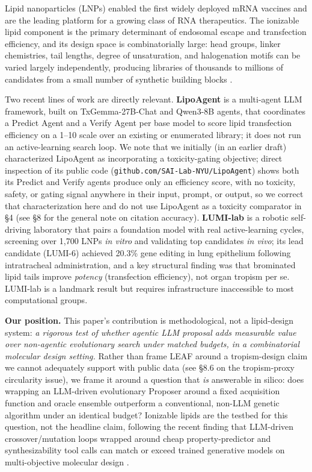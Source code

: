 \documentclass{article}
\begin{document}
Lipid nanoparticles (LNPs) enabled the first widely deployed mRNA vaccines
and are the leading platform for a growing class of RNA therapeutics. The
ionizable lipid component is the primary determinant of endosomal escape
and transfection efficiency, and its design space is combinatorially large:
head groups, linker chemistries, tail lengths, degree of unsaturation, and
halogenation motifs can be varied largely independently, producing
libraries of thousands to millions of candidates from a small number of
synthetic building blocks \citep{xu2023ugi}.

Two recent lines of work are directly relevant. \textbf{LipoAgent}
\citep{li2025lipoagent} is a multi-agent LLM framework, built on
TxGemma-27B-Chat and Qwen3-8B agents, that coordinates a Predict Agent and
a Verify Agent per base model to score lipid transfection efficiency on a
1--10 scale over an existing or enumerated library; it does not run an
active-learning search loop. We note that we initially (in an earlier
draft) characterized LipoAgent as incorporating a toxicity-gating
objective; direct inspection of its public code
(\texttt{github.com/SAI-Lab-NYU/LipoAgent}) shows both its Predict and
Verify agents produce only an efficiency score, with no toxicity, safety,
or gating signal anywhere in their input, prompt, or output, so we correct
that characterization here and do not use LipoAgent as a toxicity
comparator in \S4 (see \S8 for the general note on citation accuracy).
\textbf{LUMI-lab} \citep{lumilab2026} is a robotic self-driving laboratory
that pairs a foundation model with real active-learning cycles, screening
over 1,700 LNPs \emph{in vitro} and validating top candidates \emph{in
vivo}; its lead candidate (LUMI-6) achieved 20.3\% gene editing in lung
epithelium following intratracheal administration, and a key structural
finding was that brominated lipid tails improve \emph{potency}
(transfection efficiency), not organ tropism per se. LUMI-lab is a landmark
result but requires infrastructure inaccessible to most computational
groups.

\textbf{Our position.} This paper's contribution is methodological, not a
lipid-design system: \emph{a rigorous test of whether agentic LLM
proposal adds measurable value over non-agentic evolutionary search under
matched budgets, in a combinatorial molecular design setting.} Rather
than frame LEAF around a tropism-design claim we cannot adequately
support with public data (see \S8.6 on the tropism-proxy circularity
issue), we frame it around a question that \emph{is} answerable in
silico: does wrapping an LLM-driven evolutionary Proposer around a fixed
acquisition function and oracle ensemble outperform a conventional,
non-LLM genetic algorithm under an identical budget? Ionizable lipids are
the testbed for this question, not the headline claim, following the
recent finding that LLM-driven crossover/mutation loops wrapped around
cheap property-predictor and synthesizability tool calls can match or
exceed trained generative models on multi-objective molecular design
\citep{toolmol2026}.
\end{document}

